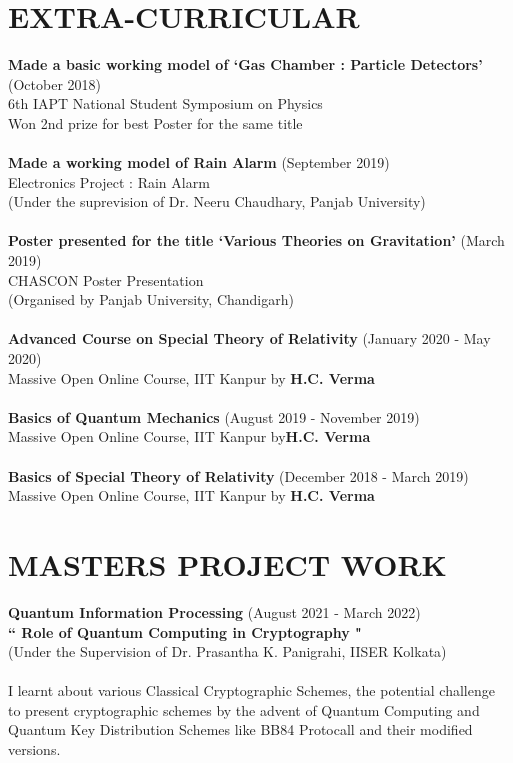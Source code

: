 \documentclass[12pt]{article}
\begin{document}
\section{EXTRA-CURRICULAR}
\textbf{Made a basic working model of `Gas Chamber : Particle Detectors'} \hfill (October 2018)\\
6th IAPT National Student Symposium on Physics\\
Won 2nd prize for best Poster for the same title\\ \\
\textbf{Made a working model of Rain Alarm} \hfill (September 2019)\\
Electronics Project : Rain Alarm\\
(Under the suprevision of Dr. Neeru Chaudhary, Panjab University)\\ \\
\textbf{Poster presented for the title `Various Theories on Gravitation'} \hfill (March 2019)\\
CHASCON Poster Presentation\\
(Organised by Panjab University, Chandigarh)\\ \\
\textbf{Advanced Course on Special Theory of Relativity} \hfill (January 2020 - May 2020)\\
Massive Open Online Course, IIT Kanpur by \textbf{H.C. Verma}\\ \\
\textbf{Basics of Quantum Mechanics} \hfill (August 2019 - November 2019)\\
Massive Open Online Course, IIT Kanpur by\textbf{H.C. Verma}\\ \\
\textbf{Basics of Special Theory of Relativity} \hfill (December 2018 - March 2019) \\
Massive Open Online Course, IIT Kanpur by \textbf{H.C. Verma}\\

\section*{MASTERS PROJECT WORK}
\textbf{Quantum Information Processing} \hfill (August 2021 - March 2022)\\
\textbf{`` Role of Quantum Computing in Cryptography "} \\
(Under the Supervision of Dr. Prasantha K. Panigrahi, IISER Kolkata)\\ \\
I learnt about various
Classical Cryptographic Schemes, the potential challenge to present cryptographic
schemes by the advent of Quantum Computing and Quantum Key Distribution Schemes
like BB84 Protocall and their modified versions.

\end{document}
